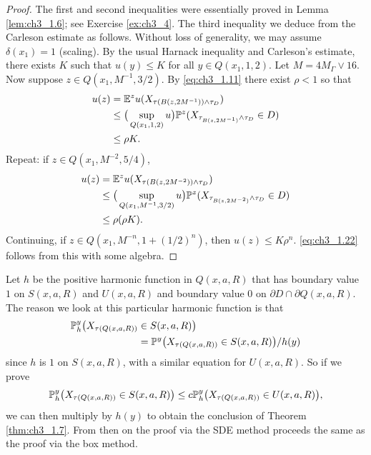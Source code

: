 \begin{proof}
The first and second inequalities were essentially proved in Lemma \ref{lem:ch3_1.6}; see Exercise \ref{ex:ch3_4}. The third inequality we deduce from the Carleson estimate as follows. Without loss of generality, we may assume $\delta(x_1) = 1$ (scaling). By the usual Harnack inequality and Carleson's estimate, there exists $K$ such that $u(y) \leq K$ for all $y \in Q(x_1,1,2)$. Let $M = 4M_\Gamma \vee 16$. Now suppose $z \in Q(x_1,M^{-1},3/2)$. By \eqref{eq:ch3_1.11} there exist $\rho < 1$ so that
\begin{align*}
    u(z) &= \E^z u(X_{\tau(B(z,2M^{-1}))\wedge\tau_D}) \\
    &\leq \big(\sup_{Q(x_1,1,2)} u\big)\P^z(X_{\tau_{B(z,2M^{-1})}\wedge \tau_D} \in D) \\
    &\leq \rho K.
\end{align*}
Repeat: if $z \in Q(x_1,M^{-2},5/4)$,
\begin{align*}
    u(z) &= \E^z u(X_{\tau(B(z,2M^{-2}))\wedge\tau_D}) \\
    &\leq \big(\sup_{Q(x_1,M^{-1},3/2)} u\big)\P^z(X_{\tau_{B(z,2M^{-2})}\wedge \tau_D} \in D) \\
    &\leq \rho(\rho K).
\end{align*}
Continuing, if $z \in Q(x_1,M^{-n},1+(1/2)^n)$, then $u(z) \leq K\rho^n$. \eqref{eq:ch3_1.22} follows from this with some algebra.
\end{proof}

Let $h$ be the positive harmonic function in $Q(x,a,R)$ that has boundary value $1$ on $S(x,a,R)$ and $U(x,a,R)$ and boundary value $0$ on $\partial D \cap \partial Q(x,a,R)$. The reason we look at this particular harmonic function is that
\begin{align}\label{eq:ch3_1.23}
    \P_h^y\big(X_{\tau(Q(x,a,R))} &\in S(x,a,R)\big) \\
    &= \P^y\big(X_{\tau(Q(x,a,R))} \in S(x,a,R)\big)/h(y) \notag
\end{align}
since $h$ is $1$ on $S(x,a,R)$, with a similar equation for $U(x,a,R)$. So if we prove
\begin{equation}\label{eq:ch3_1.24}
    \P_h^y\big(X_{\tau(Q(x,a,R))} \in S(x,a,R)\big) \leq c\P_h^y\big(X_{\tau(Q(x,a,R))} \in U(x,a,R)\big),
\end{equation}
we can then multiply by $h(y)$ to obtain the conclusion of Theorem \ref{thm:ch3_1.7}. From then on the proof via the SDE method proceeds the same as the proof via the box method.

